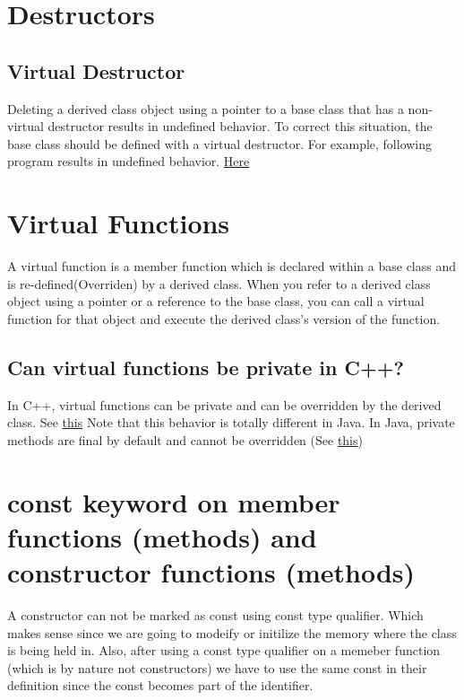 \documentclass[11pt,twoside,a4paper]{report}
\begin{document}
\section{Destructors}
\subsection{Virtual Destructor}
Deleting a derived class object using a pointer to a base class that has a non-virtual destructor results in undefined behavior. To correct this situation, the base class should be defined with a virtual destructor.
For example, following program results in undefined behavior. \href{https://www.geeksforgeeks.org/virtual-destructor/}{Here}

\section{Virtual Functions}
A virtual function is a member function which is declared within a base class and is re-defined(Overriden)
by a derived class. When you refer to a derived class object using a pointer or a reference to the base class,
you can call a virtual function for that object and execute the derived class’s version of the function.

\subsection{Can virtual functions be private in C++?}
In C++, virtual functions can be private and can be overridden by the derived class. See \href{https://www.geeksforgeeks.org/can-virtual-functions-be-private-in-c/}{this}
Note that this behavior is totally different in Java. In Java, private methods are final by default and cannot be overridden (See \href{https://www.geeksforgeeks.org/can-override-private-methods-java/}{this})

\section{const keyword on member functions (methods) and constructor functions (methods)}
A constructor can not be marked as const using const type qualifier. Which makes sense since we are going to modeify or initilize the memory where the class is being held in.
Also, after using a const type qualifier on a memeber function (which is by nature not constructors) we have to use the same const in their definition since the const becomes part of the
identifier.
\end{document}
